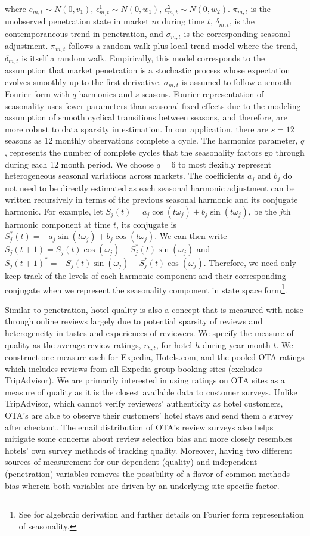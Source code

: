 \documentclass{informs_mod} %
\begin{document}
where $e_{m,t}\sim N(0,v_1)\text{, }\epsilon_{m,t}^{1}\sim N(0,w_1)\text{, }\epsilon_{m,t}^{2}\sim N(0,w_2)$. $\pi_{m,t}$ is the unobserved penetration state in market $m$ during time $t$, $\delta_{m,t}$, is the contemporaneous trend in penetration, and $\sigma_{m,t}$ is the corresponding seasonal adjustment. $\pi_{m,t}$ follows a random walk plus local trend model where the trend, $\delta_{m,t}$ is itself a random walk. Empirically, this model corresponds to the assumption that market penetration is a stochastic process whose expectation evolves smoothly up to the first derivative. $\sigma_{m,t}$ is assumed to follow a smooth Fourier form with $q$ harmonics and $s$ seasons. Fourier representation of seasonality uses fewer parameters than seasonal fixed effects due to the modeling assumption of smooth cyclical transitions between seasons, and therefore, are more robust to data sparsity in estimation. In our application, there are $s=12$ seasons as 12 monthly observations complete a cycle. The harmonics parameter, $q$, represents the number of complete cycles that the seasonality factors go through during each 12 month period. We choose $q=6$ to most flexibly represent heterogeneous seasonal variations across markets. The coefficients $a_j$ and $b_j$ do not need to be directly estimated as each seasonal harmonic adjustment can be written recursively in terms of the previous seasonal harmonic and its conjugate harmonic. For example, let $S_j(t)=a_j\cos(t\omega_j)+b_j\sin(t\omega_j)$, be the $j$th harmonic component at time $t$, its conjugate is $S_j^{*}(t)=-a_j\sin(t\omega_j)+b_j\cos(t\omega_j)$. We can then write $S_j(t+1)=S_j(t)\cos(\omega_j)+S_j^{*}(t)\sin(\omega_j)$ and $S_j(t+1)^{*}=-S_j(t)\sin(\omega_j)+S_j^{*}(t)\cos(\omega_j)$. Therefore, we need only keep track of the levels of each harmonic component and their corresponding conjugate when we represent the seasonality component in state space form\footnote{See \citet{petrisDLM} for algebraic derivation and further details on Fourier form representation of seasonality.}.

Similar to penetration, hotel quality is also a concept that is measured with noise through online reviews largely due to potential sparsity of reviews and heterogeneity in tastes and experiences of reviewers. We specify the measure of quality as the average review ratings, $r_{h,t}$, for hotel $h$ during year-month $t$. We construct one measure each for Expedia, Hotels.com, and the pooled OTA ratings which includes reviews from all Expedia group booking sites (excludes TripAdvisor). We are primarily interested in using ratings on OTA sites as a measure of quality as it is the closest available data to customer surveys. Unlike TripAdvisor, which cannot verify reviewers' authenticity as hotel customers, OTA's are able to observe their customers' hotel stays and send them a survey after checkout. The email distribution of OTA's review surveys also helps mitigate some concerns about review selection bias and more closely resembles hotels' own survey methods of tracking quality. Moreover, having two different sources of measurement for our dependent (quality) and independent (penetration) variables removes the possibility of a flavor of common methods bias wherein both variables are driven by an underlying site-specific factor.
\end{document}
